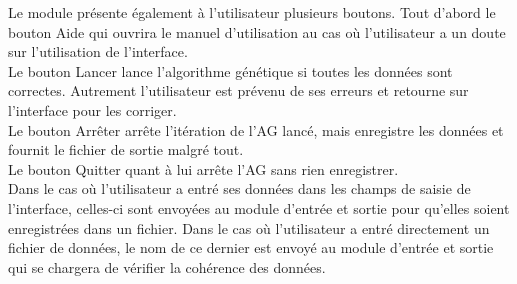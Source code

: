 \documentclass[a4paper,11pt]{article}
\begin{document}
			Le module présente également à l’utilisateur plusieurs boutons.
			Tout d’abord le bouton Aide qui ouvrira le manuel d’utilisation au cas où l’utilisateur a un doute sur l’utilisation de l’interface.\\
			Le bouton Lancer lance l’algorithme génétique si toutes les données sont correctes.
			Autrement l’utilisateur est prévenu de ses erreurs et retourne sur l’interface pour les corriger.\\
			Le bouton Arrêter arrête l’itération de l’AG lancé, mais enregistre les données et fournit le fichier de sortie malgré tout.\\
			Le bouton Quitter quant à lui arrête l’AG sans rien enregistrer.\\
			Dans le cas où l’utilisateur a entré ses données dans les champs de saisie de l’interface, celles-ci sont envoyées au module d’entrée et sortie pour qu’elles soient enregistrées dans un fichier.
			Dans le cas où l’utilisateur a entré directement un fichier de données, le nom de ce dernier est envoyé au module d’entrée et sortie qui se chargera de vérifier la cohérence des données.\\
\end{document}
